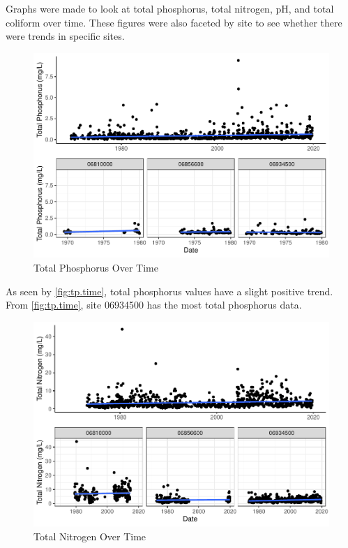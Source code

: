 \documentclass[12pt,]{article}
\begin{document}
Graphs were made to look at total phosphorus, total nitrogen, pH, and
total coliform over time. These figures were also faceted by site to see
whether there were trends in specific sites.

\begin{figure}
\centering
\includegraphics{Project_Template_files/figure-latex/tp.time-1.pdf}
\caption{\label{fig:tp.time}Total Phosphorus Over Time}
\end{figure}

As seen by \autoref{fig:tp.time}, total phosphorus values have a slight
positive trend. From \autoref{fig:tp.time}, site 06934500 has the most
total phosphorus data.

\begin{figure}
\centering
\includegraphics{Project_Template_files/figure-latex/tn.time-1.pdf}
\caption{\label{fig:tn.time}Total Nitrogen Over Time}
\end{figure}
\end{document}
